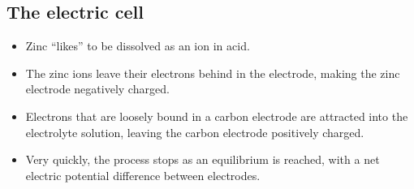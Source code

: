 \documentclass[aspectratio=169,
hyperref={colorlinks,urlcolor=blue}
]{beamer}
\begin{document}
\subsection{The electric cell}
\label{subsec:thelectriccell}
{
\begin{itemize}
\item Zinc ``likes'' to be dissolved as an ion in acid.
\item The zinc ions leave their electrons behind in the electrode, making the zinc electrode negatively charged.
\item Electrons that are loosely bound in a carbon electrode are attracted into the electrolyte solution, leaving the carbon electrode positively charged.
\item Very quickly, the process stops as an equilibrium is reached, with a net electric potential difference between electrodes.
\end{itemize}
}
\end{document}
